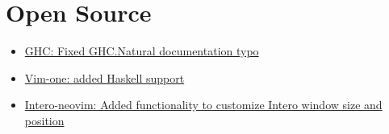 \section{Open Source}

\begin{itemize}
	\item \href{https://github.com/ghc/ghc/commit/36c1431d9d2d06049190cc0888dbfaee8e2179d6}{GHC: Fixed GHC.Natural documentation typo}
	\item \href{https://github.com/rakr/vim-one/commit/8e1118ecec916e1334694a44ef29db70fb679682}{Vim-one: added Haskell support}
	\item \href{https://github.com/parsonsmatt/intero-neovim/commit/26d340ab0d6e8d40cbafaf72dac0588ae901c117}{Intero-neovim: Added functionality to customize Intero window size and position}
\end{itemize}
